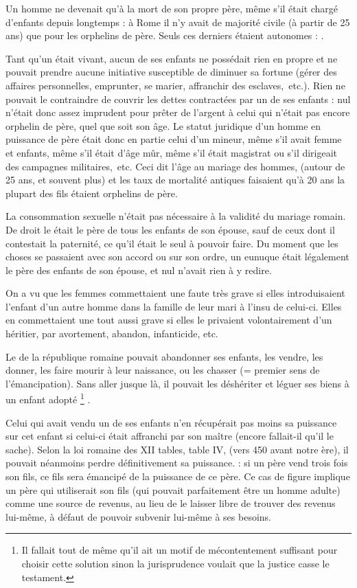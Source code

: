 Un homme ne devenait  qu'à la mort de son propre
père, même s'il était chargé d'enfants depuis longtemps : à Rome il n'y
avait de majorité civile (à partir de 25 ans) que pour les orphelins de père.
Seuls ces derniers étaient autonomes : .

Tant qu'un  était vivant, aucun de ses enfants ne possédait
rien en propre et ne pouvait prendre aucune initiative susceptible
de diminuer sa fortune (gérer des affaires personnelles, emprunter, se
marier, affranchir des esclaves,~etc.). Rien ne pouvait le contraindre de
couvrir les dettes contractées par un de ses enfants : nul n'était donc assez
imprudent pour prêter de l'argent à celui qui n'était pas encore orphelin
de père, quel que soit son âge. Le statut juridique d'un homme en
puissance de père était donc en partie celui d'un mineur, même s'il avait
femme et enfants, même s'il était d'âge mûr, même s'il était magistrat ou
s'il dirigeait des campagnes militaires,~etc. Ceci dit l'âge au mariage des
hommes, (autour de 25 ans, et souvent plus) et les taux de mortalité antiques
faisaient qu'à 20 ans la plupart des fils étaient orphelins de père.

La consommation sexuelle n'était pas nécessaire à la validité du
mariage romain. De droit le  était le père de tous les enfants
de son épouse, sauf de ceux dont il contestait la paternité, ce qu'il était le
seul à pouvoir faire. Du moment que les choses se passaient avec son accord
ou sur son ordre, un eunuque était légalement le père des enfants de
son épouse, et nul n'avait rien à y redire.

On a vu que les femmes commettaient une faute très grave si elles
introduisaient l'enfant d'un autre homme dans la famille de leur mari à
l'insu de celui-ci. Elles en commettaient une tout aussi grave si elles le
privaient volontairement d'un héritier, par avortement, abandon, infanticide,
etc.

Le  de la république romaine pouvait abandonner ses
enfants, les vendre, les donner, les faire mourir à leur naissance, ou les
chasser (= premier sens de l'émancipation). Sans aller jusque là, il pouvait
les déshériter et léguer ses biens à un enfant adopté%
\footnote{Il fallait tout de même qu'il ait un motif de mécontentement suffisant pour choisir cette solution sinon
la jurisprudence voulait que la justice casse le testament.}%
.

Celui qui avait vendu un de ses enfants n'en récupérait pas moins
sa puissance  sur cet enfant si celui-ci était affranchi par son maître
(encore fallait-il qu'il le sache). Selon la loi romaine des XII tables, table
IV, (vers 450 avant notre ère), il pouvait néanmoins perdre définitivement
sa puissance. {}:
si un père vend trois fois son fils, ce fils sera émancipé de la puissance de
ce père. Ce cas de figure implique un père qui utiliserait son fils (qui
pouvait parfaitement être un homme adulte) comme une source de revenus,
au lieu de le laisser libre de trouver des revenus lui-même, à défaut
de pouvoir subvenir lui-même à ses besoins.

